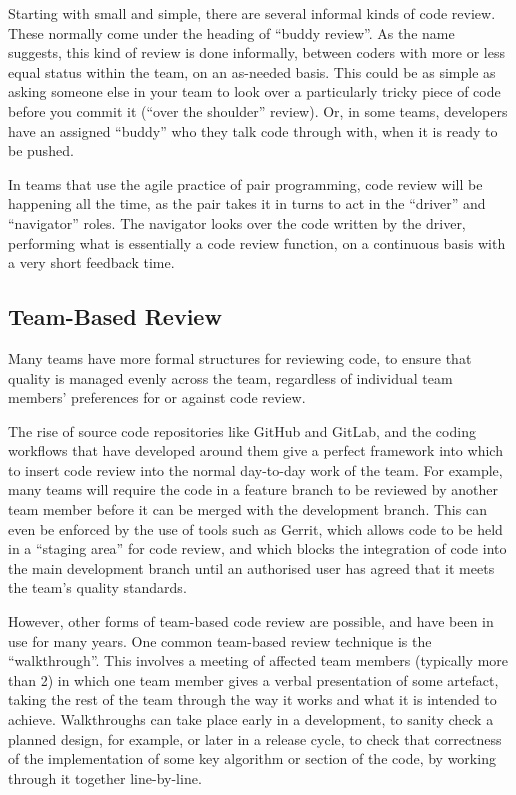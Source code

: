 \documentclass[
]{book}
\begin{document}
Starting with small and simple, there are several informal kinds of code review. These normally come under the heading of ``buddy review''. As the name suggests, this kind of review is done informally, between coders with more or less equal status within the team, on an as-needed basis. This could be as simple as asking someone else in your team to look over a particularly tricky piece of code before you commit it (``over the shoulder'' review). Or, in some teams, developers have an assigned ``buddy'' who they talk code through with, when it is ready to be pushed.

In teams that use the agile practice of pair programming, code review will be happening all the time, as the pair takes it in turns to act in the ``driver'' and ``navigator'' roles. The navigator looks over the code written by the driver, performing what is essentially a code review function, on a continuous basis with a very short feedback time.

\hypertarget{goteam}{%
\subsection{Team-Based Review}\label{goteam}}

Many teams have more formal structures for reviewing code, to ensure that quality is managed evenly across the team, regardless of individual team members' preferences for or against code review.

The rise of source code repositories like GitHub and GitLab, and the coding workflows that have developed around them give a perfect framework into which to insert code review into the normal day-to-day work of the team. For example, many teams will require the code in a feature branch to be reviewed by another team member before it can be merged with the development branch. This can even be enforced by the use of tools such as Gerrit, which allows code to be held in a ``staging area'' for code review, and which blocks the integration of code into the main development branch until an authorised user has agreed that it meets the team's quality standards.

However, other forms of team-based code review are possible, and have been in use for many years. One common team-based review technique is the ``walkthrough''. This involves a meeting of affected team members (typically more than 2) in which one team member gives a verbal presentation of some artefact, taking the rest of the team through the way it works and what it is intended to achieve. Walkthroughs can take place early in a development, to sanity check a planned design, for example, or later in a release cycle, to check that correctness of the implementation of some key algorithm or section of the code, by working through it together line-by-line.
\end{document}
